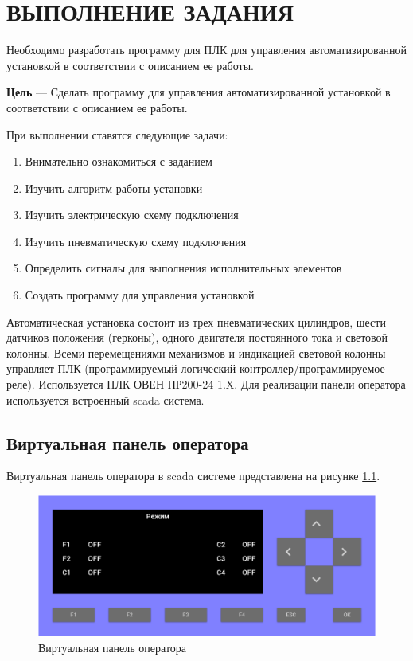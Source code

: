 \chapter{ВЫПОЛНЕНИЕ ЗАДАНИЯ}
Необходимо разработать программу для ПЛК для управления автоматизированной
установкой в соответствии с описанием ее работы.

\textbf{Цель} --- Сделать программу для управления автоматизированной установкой в соответствии с описанием ее работы.

При выполнении ставятся следующие задачи:
\begin{enumerate}
    \item Внимательно ознакомиться с заданием
    \item Изучить алгоритм работы установки
    \item Изучить электрическую схему подключения
    \item Изучить пневматическую схему подключения
    \item Определить сигналы для выполнения исполнительных элементов
    \item Создать программу для управления установкой
\end{enumerate}

Автоматическая установка состоит из трех пневматических цилиндров, шести
датчиков положения (герконы), одного двигателя постоянного тока и световой
колонны. Всеми перемещениями механизмов и индикацией световой колонны
управляет ПЛК (программируемый логический контроллер/программируемое
реле). Используется ПЛК ОВЕН ПР200-24 1.X.
Для реализации панели оператора используется встроенный scada система.

\section{Виртуальная панель оператора}
Виртуальная панель оператора в scada системе представлена на рисунке \ref{fig:scada_panel}.
\begin{figure}[hb]
    \centering
    \includegraphics[width=1\textwidth]{fig/vpanel.png}
    \caption{Виртуальная панель оператора}
    \label{fig:scada_panel}
\end{figure}

